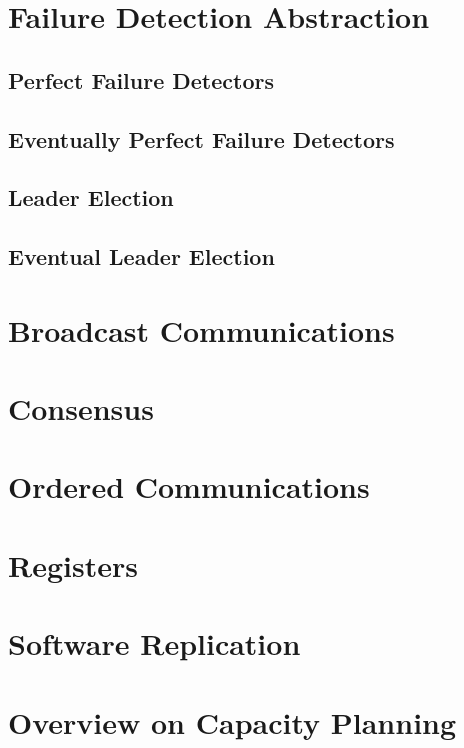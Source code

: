 	\newpage
	\section{Failure Detection Abstraction}
	
	\subsection{Perfect Failure Detectors}
	
	\subsection{Eventually Perfect Failure Detectors}
	
	\subsection{Leader Election}
	
	\subsection{Eventual Leader Election}
	
	\newpage
	\section{Broadcast Communications}
	
	\newpage
	\section{Consensus}
	
	\newpage
	\section{Ordered Communications}
	
	\newpage
	\section{Registers}
	
	\newpage
	\section{Software Replication}
	
	\newpage
	\section{Overview on Capacity Planning}
	
